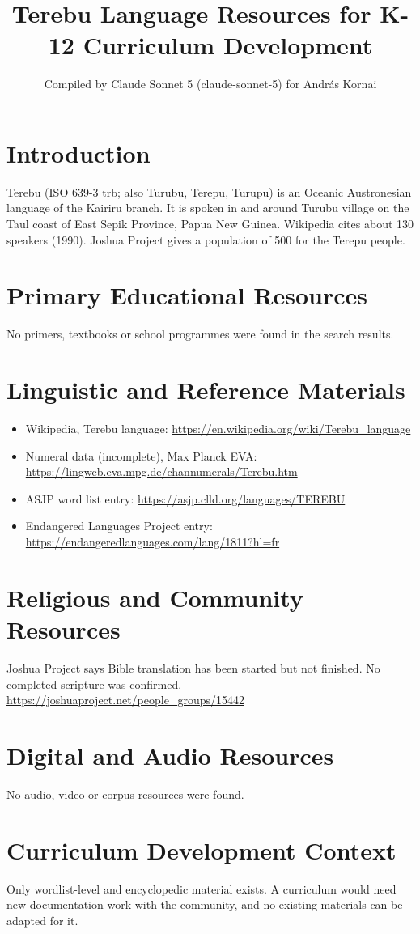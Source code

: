 \documentclass[12pt]{article}
\title{Terebu Language Resources for K-12 Curriculum Development}
\author{Compiled by Claude Sonnet 5 (claude-sonnet-5) for Andr\'as Kornai}
\date{}
\begin{document}
\maketitle
\section{Introduction}
Terebu (ISO 639-3 trb; also Turubu, Terepu, Turupu) is an Oceanic Austronesian language of the Kairiru branch. It is spoken in and around Turubu village on the Taul coast of East Sepik Province, Papua New Guinea. Wikipedia cites about 130 speakers (1990). Joshua Project gives a population of 500 for the Terepu people.
\section{Primary Educational Resources}
No primers, textbooks or school programmes were found in the search results.
\section{Linguistic and Reference Materials}
\begin{itemize}
\item Wikipedia, Terebu language: \url{https://en.wikipedia.org/wiki/Terebu_language}
\item Numeral data (incomplete), Max Planck EVA: \url{https://lingweb.eva.mpg.de/channumerals/Terebu.htm}
\item ASJP word list entry: \url{https://asjp.clld.org/languages/TEREBU}
\item Endangered Languages Project entry: \url{https://endangeredlanguages.com/lang/1811?hl=fr}
\end{itemize}
\section{Religious and Community Resources}
Joshua Project says Bible translation has been started but not finished. No completed scripture was confirmed. \url{https://joshuaproject.net/people_groups/15442}
\section{Digital and Audio Resources}
No audio, video or corpus resources were found.
\section{Curriculum Development Context}
Only wordlist-level and encyclopedic material exists. A curriculum would need new documentation work with the community, and no existing materials can be adapted for it.
\end{document}
